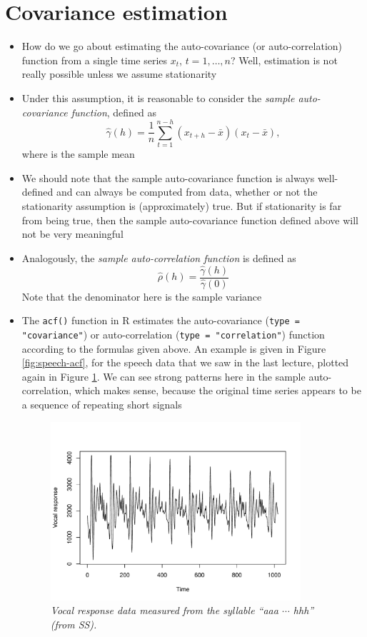 \documentclass{article}
\begin{document}
\section{Covariance estimation}

\begin{itemize}
\item How do we go about estimating the auto-covariance (or auto-correlation)
  function from a single time series $x_t$, $t = 1,\dots,n$? Well, estimation is 
  not really possible unless we assume stationarity

\item Under this assumption, it is reasonable to consider the \emph{sample 
    auto-covariance function}, defined as 
  \[
  \hat\gamma(h) = \frac{1}{n} \sum_{t=1}^{n-h} (x_{t+h} - \bar{x})(x_t -
  \bar{x}),
  \]
  where  is the sample mean

\item We should note that the sample auto-covariance function is always
  well-defined and can always be computed from data, whether or not the
  stationarity assumption is (approximately) true. But if stationarity is far
  from being true, then the sample auto-covariance function defined above will
  not be very meaningful 

\item Analogously, the \emph{sample auto-correlation function} is defined as 
  \[
  \hat\rho(h) = \frac{\hat\gamma(h)}{\hat\gamma(0)}
  \]
  Note that the denominator here is the sample variance

\item The \verb|acf()| function in R estimates the auto-covariance
  (\verb|type = "covariance"|) or auto-correlation 
  (\verb|type = "correlation"|) function according to the formulas given
  above. An example is given in Figure \ref{fig:speech-acf}, for the speech data
  that we saw in the last lecture, plotted again in Figure
  \ref{fig:speech-ts}. We can see strong patterns here in the sample
  auto-correlation, which makes sense, because the original time series appears
  to be a sequence of repeating short signals   

\begin{figure}[p]
\centering
\includegraphics[width=0.875\textwidth]{fig/speech-1.pdf}
\caption{\it Vocal response data measured from the syllable ``aaa $\cdots$ hhh''
  (from SS).}  
\label{fig:speech-ts}


\end{figure}
\end{itemize}
\end{document}
